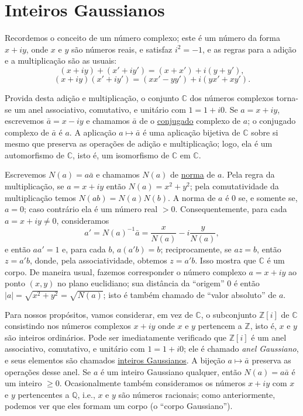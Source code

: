 \section{Inteiros Gaussianos}

Recordemos o conceito de um número complexo; este é um número da forma
$x + iy$, onde $x$ e $y$ são números reais, e satisfaz $i^2 = -1$, e as
regras para a adição e a multiplicação são as usuais:
\[
(x + iy) + (x' + iy') = (x + x') + i(y + y'),
\]
\[
(x + iy)(x' + iy') = (xx' - yy') + i(yx' + xy').
\]

Provida desta adição e multiplicação, o conjunto $\mathbb{C}$ dos números
complexos torna-se um anel associativo, comutativo, e unitário com
$1 = 1 + i0$. Se $a = x + iy$, escrevemos $\bar{a} = x - iy$ e chamamos
$\bar{a}$ de o \underline{conjugado} complexo de $a$; o conjugado complexo de
$\bar{a}$ é $a$. A aplicação $a \mapsto \bar{a}$ é uma aplicação bijetiva
de $\mathbb{C}$ sobre si mesmo que preserva as operações de adição e
multiplicação; logo, ela é um automorfismo de $\mathbb{C}$, isto é, um
isomorfismo de $\mathbb{C}$ em $\mathbb{C}$.

Escrevemos $N(a) = a\bar{a}$ e chamamos $N(a)$ de \underline{norma} de $a$. Pela
regra da multiplicação, se $a = x + iy$ então $N(a) = x^2 + y^2$; pela
comutatividade da multiplicação temos $N(ab) = N(a)N(b)$. A norma de $a$
é $0$ se, e somente se, $a = 0$; caso contrário ela é um número real
$> 0$. Consequentemente, para cada $a = x + iy \neq 0$, consideramos
\[
a' = N(a)^{-1}\bar{a}
     = \frac{x}{N(a)} - i\frac{y}{N(a)},
\]
e então $aa' = 1$ e, para cada $b$, $a(a'b) = b$; reciprocamente, se
$az = b$, então $z = a'b$, donde, pela associatividade, obtemos
$z = a'b$. Isso mostra que $\mathbb{C}$ é um corpo.
De maneira usual, fazemos corresponder o número complexo
$a = x + iy$ ao ponto $(x,y)$ no plano euclidiano; sua distância da
``origem'' $0$ é então $|a| = \sqrt{x^2 + y^2} = \sqrt{N(a)}$;
isto é também chamado de ``valor absoluto'' de $a$.

Para nossos propósitos, vamos considerar, em vez de $\mathbb{C}$, o
subconjunto $\mathbb{Z}[i]$ de $\mathbb{C}$ consistindo nos números
complexos $x + iy$ onde $x$ e $y$ pertencem a $\mathbb{Z}$, isto é,
$x$ e $y$ são inteiros ordinários. Pode ser imediatamente verificado
que $\mathbb{Z}[i]$ é um anel associativo, comutativo, e unitário com
$1 = 1 + i0$; ele é chamado \emph{anel Gaussiano}, e seus elementos são
chamados \underline{inteiros Gaussianos}. A bijeção
$a \mapsto \bar{a}$ preserva as operações desse anel. Se $a$ é um inteiro
Gaussiano qualquer, então $N(a) = a\bar{a}$ é um inteiro $\ge 0$.
Ocasionalmente também consideramos os números $x + iy$ com $x$ e $y$
pertencentes a $\mathbb{Q}$, i.e., $x$ e $y$ são números racionais; como
anteriormente, podemos ver que eles formam um corpo (o ``corpo
Gaussiano'').

